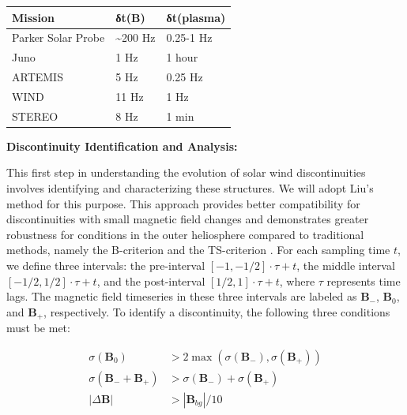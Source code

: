\documentclass[
  letterpaper,
  DIV=11,
  numbers=noendperiod]{scrartcl}
\begin{document}
\begin{longtable}[]{@{}lll@{}}
\toprule\noalign{}
Mission & δt(B) & δt(plasma) \\
\midrule\noalign{}
\endhead
\bottomrule\noalign{}
\endlastfoot
Parker Solar Probe & \textasciitilde200 Hz & 0.25-1 Hz \\
Juno & 1 Hz & 1 hour \\
ARTEMIS & 5 Hz & 0.25 Hz \\
WIND & 11 Hz & 1 Hz \\
STEREO & 8 Hz & 1 min \\
\end{longtable}

\textbf{Discontinuity Identification and Analysis:}

This first step in understanding the evolution of solar wind discontinuities involves identifying and characterizing these structures. We will adopt Liu's method \citep{liuMagneticDiscontinuitiesSolar2022} for this purpose. This approach provides better compatibility for discontinuities with small magnetic field changes and demonstrates greater robustness for conditions in the outer heliosphere compared to traditional methods, namely the B-criterion \citep{burlagaDirectionalDiscontinuitiesInterplanetary1969} and the TS-criterion \citep{tsurutaniInterplanetaryDiscontinuitiesTemporal1979}. For each sampling time \(t\), we define three intervals: the pre-interval \([-1,-1/2]\cdot τ+t\), the middle interval \([-1/2,1/2]\cdot τ+t\), and the post-interval \([1/2,1]\cdot τ+t\), where \(τ\) represents time lags. The magnetic field timeseries in these three intervals are labeled as \({\mathbf B}_-\), \({\mathbf B}_0\), and \({\mathbf B}_+\), respectively. To identify a discontinuity, the following three conditions must be met:

\[
\begin{aligned}
\sigma({\mathbf B}_0) &> 2\max\left(\sigma({\mathbf B}_-), \sigma({\mathbf B}_+)\right) \\
\sigma\left({\mathbf B}_-+{\mathbf B}_+\right) &>\sigma({\mathbf B}_-)+\sigma({\mathbf B}_+) \\
|\Delta {\mathbf B}| &>|{\mathbf B}_{bg}|/10
\end{aligned}
\]
\end{document}
